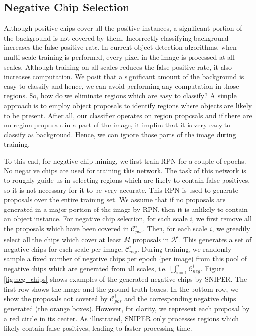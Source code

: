 \documentclass{article}
\begin{document}
\subsection{Negative Chip Selection}
\label{sec:neg}
Although positive chips cover all the positive instances, a significant portion of the background is not covered by them. Incorrectly classifying background increases the false positive rate. In current object detection algorithms, when multi-scale training is performed, every pixel in the image is processed at all scales. Although training on all scales reduces the false positive rate, it also increases computation. We posit that a significant amount of the background is easy to classify and hence, we can avoid performing any computation in those regions. So, how do we eliminate regions which are easy to classify? A simple approach is to employ object proposals to identify regions where objects are likely to be present. After all, our classifier operates on region proposals and if there are no region proposals in a part of the image, it implies that it is very easy to classify as background. Hence, we can ignore those parts of the image during training.


To this end, for negative chip mining, we first train RPN for a couple of epochs. No negative chips are used for training this network. The task of this network is to roughly guide us in selecting regions which are likely to contain false positives, so it is not necessary for it to be very accurate. This RPN is used to generate proposals over the entire training set.  We assume that if no proposals are generated in a major portion of the image by RPN, then it is unlikely to contain an object instance. For negative chip selection, for each scale $i$, we first remove all the proposals which have been covered in $\mathcal{C}_{pos}^i$. Then, for each scale $i$, we greedily select all the chips which cover at least $M$ proposals in $\mathcal{R}^i$. This generates a set of negative chips for each scale per image, $\mathcal{C}_{neg}^i$. During training, we randomly sample a fixed number of negative chips per epoch (per image) from this pool of negative chips which are generated from all scales, i.e. $\bigcup_{i=1}^{n} \mathcal{C}_{neg}^i$. Figure \ref{fig:neg_chips} shows examples of the generated negative chips by SNIPER. The first row shows the image and the ground-truth boxes. In the bottom row, we show the proposals not covered by $\mathcal{C}_{pos}^i$ and the corresponding negative chips generated (the orange boxes). However, for clarity, we represent each proposal by a red circle in its center. As illustrated, SNIPER only processes regions which likely contain false positives, leading to faster processing time.
\end{document}
